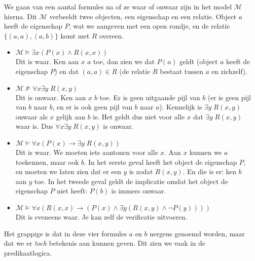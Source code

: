 \begin{example}\label{vb:pred:model:prop}
We gaan van een aantal formules na of ze waar of onwaar zijn in het model $\mathcal M$ hierna. Dit $\mathcal M$ verbeeldt twee objecten, een eigenschap en een relatie. Object $a$ heeft de eigenschap $P$, wat we aangeven met een open rondje, en de relatie $\{(a,a), (a,b)\}$ komt met $R$ overeen.

\begin{center}
\end{center}
\begin{itemize}
    \item $\mathcal M \vDash \exists x(P(x)\wedge R(x,x))$\\
    Dit is waar. Ken aan $x$ $a$ toe, dan zien we dat $P(a)$ geldt (object $a$ heeft de eigenschap $P$) en dat $(a,a)\in R$ (de relatie $R$ bestaat tussen $a$ en zichzelf).
    \item $\mathcal M \not\vDash \forall x\exists y\;R(x,y)$\\
    Dit is onwaar. Ken aan $x$ $b$ toe. Er is geen uitgaande pijl van $b$ (er is geen pijl van $b$ naar $b$, en er is ook geen pijl van $b$ naar $a$). Kennelijk is $\exists y\;R(x,y)$ onwaar als $x$ gelijk aan $b$ is. Het geldt dus niet voor alle $x$ dat $\exists y\;R(x,y)$ waar is. Dus $\forall x\exists y\;R(x,y)$ is onwaar.
    \item $\mathcal M \vDash \forall x(P(x)\rightarrow\exists y\;R(x,y))$\\
    Dit is waar. We moeten iets aantonen voor alle $x$. Aan $x$ kunnen we $a$ toekennen, maar ook $b$. In het eerste geval heeft het object de eigenschap $P$, en moeten we laten zien dat er een $y$ is zodat $R(x,y)$. En die is er: ken $b$ aan $y$ toe. In het tweede geval geldt de implicatie omdat het object de eigenschap $P$ niet heeft: $P(b)$ is immers onwaar.
    \item $\mathcal M \vDash \forall x(R(x,x)\rightarrow(P(x)\wedge \exists y(R(x,y)\wedge\neg P(y))))$\\
    Dit is eveneens waar. Je kan zelf de verificatie uitvoeren.
\end{itemize}
Het grappige is dat in deze vier formules $a$ en $b$ nergens genoemd worden, maar dat we er \textit{toch} betekenis aan kunnen geven. Dit zien we vaak in de predikaatlogica.
\end{example}

